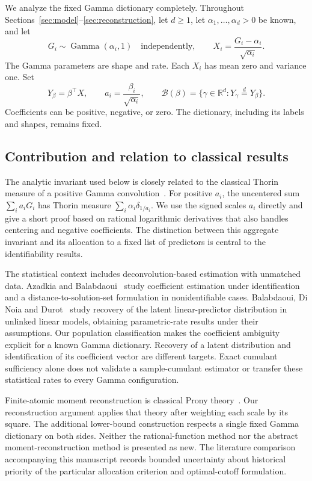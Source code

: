 \documentclass[11pt]{article}
\theoremstyle{definition}\newtheorem{definition}[theorem]{Definition}
\theoremstyle{remark}\newtheorem{remark}[theorem]{Remark}
\newcommand{\R}{\mathbb R}
\newcommand{\B}{\mathcal B}
\newcommand{\eqd}{\overset{d}{=}}
\begin{document}
We analyze the fixed Gamma dictionary completely. Throughout Sections~\ref{sec:model}--\ref{sec:reconstruction}, let $d\ge1$, let $\alpha_1,\ldots,\alpha_d>0$ be known, and let
\begin{equation}\label{eq:model}
 G_i\sim\operatorname{Gamma}(\alpha_i,1)\quad\text{independently},\qquad
 X_i=\frac{G_i-\alpha_i}{\sqrt{\alpha_i}}.
\end{equation}
The Gamma parameters are shape and rate. Each $X_i$ has mean zero and variance one. Set
\begin{equation}\label{eq:scales}
 Y_\beta=\beta^\top X,\qquad a_i=\frac{\beta_i}{\sqrt{\alpha_i}},\qquad
 \B(\beta)=\{\gamma\in\R^d:Y_\gamma\eqd Y_\beta\}.
\end{equation}
Coefficients can be positive, negative, or zero. The dictionary, including its labels and shapes, remains fixed.

\subsection{Contribution and relation to classical results}
The analytic invariant used below is closely related to the classical Thorin measure of a positive Gamma convolution~\cite{JRY}. For positive $a_i$, the uncentered sum $\sum_i a_iG_i$ has Thorin measure $\sum_i\alpha_i\delta_{1/a_i}$. We use the signed scales $a_i$ directly and give a short proof based on rational logarithmic derivatives that also handles centering and negative coefficients. The distinction between this aggregate invariant and its allocation to a fixed list of predictors is central to the identifiability results.

The statistical context includes deconvolution-based estimation with unmatched data. Azadkia and Balabdaoui~\cite{AB} study coefficient estimation under identification and a distance-to-solution-set formulation in nonidentifiable cases. Balabdaoui, Di Noia and Durot~\cite{BDD} study recovery of the latent linear-predictor distribution in unlinked linear models, obtaining parametric-rate results under their assumptions. Our population classification makes the coefficient ambiguity explicit for a known Gamma dictionary. Recovery of a latent distribution and identification of its coefficient vector are different targets. Exact cumulant sufficiency alone does not validate a sample-cumulant estimator or transfer these statistical rates to every Gamma configuration.

Finite-atomic moment reconstruction is classical Prony theory~\cite{KPR}. Our reconstruction argument applies that theory after weighting each scale by its square. The additional lower-bound construction respects a single fixed Gamma dictionary on both sides. Neither the rational-function method nor the abstract moment-reconstruction method is presented as new. The literature comparison accompanying this manuscript records bounded uncertainty about historical priority of the particular allocation criterion and optimal-cutoff formulation.
\end{document}
